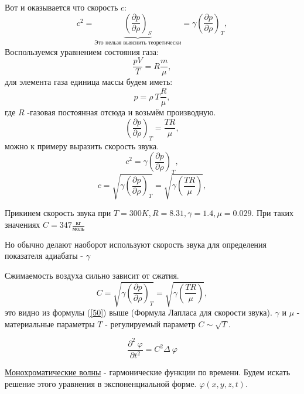 \documentclass[14pt,a4paper,oneside]{extarticle}	%
\newcommand{\bracket}[1] {\left( #1 \right) } %
\newcommand{\dd}[1] {\partial #1 }
\begin{document}
Вот и оказывается что скорость $ c $:
\begin{equation}\label{45}
c^{2} = \underbrace{\bracket{\frac{\dd{p}}{\dd{\rho}}}_{S}}_{\text{Это нельзя выяснить теоретически}} = \gamma\bracket{\frac{\dd{p}}{\dd{\rho}}}_{T},
\end{equation}
Воспользуемся уравнением состояния газа:
\begin{equation}\label{46}
\frac{pV}{T} = R\frac{m}{\mu},
\end{equation}
для элемента газа единица массы будем иметь:
\begin{equation}\label{47}
p = \rho\: T\frac{R}{\mu},
\end{equation} 
где $ R $ -газовая постоянная 
отсюда и возьмём производную.
\begin{equation}\label{48}
\bracket{\frac{\dd{p}}{\dd{\rho}}}_{T} = \frac{TR}{\mu},
\end{equation} 
можно к примеру выразить скорость звука.
\begin{equation}\label{49}
c^{2} = \gamma\bracket{\frac{\dd{p}}{\dd{\rho}}}_{T},
\end{equation}
\begin{equation}\label{50}
c = \sqrt{\gamma\bracket{\frac{\dd{p}}{\dd{\rho}}}_{T}} = \sqrt{\gamma\bracket{\frac{TR}{\mu}}},
\end{equation}
 
Прикинем скорость звука при $ T = 300K, R = 8.31, \gamma = 1.4, \mu = 0.029$.
При таких значениях $ C = 347 \frac{\text{кг}}{\text{моль}}$

Но обычно делают наоборот используют скорость звука для определения показателя адиабаты - $ \gamma $  

Сжимаемость воздуха сильно зависит от сжатия.
\begin{equation*}
C = \sqrt{\gamma\bracket{\frac{\dd{p}}{\dd{\rho}}}_{T}} = \sqrt{\gamma\bracket{\frac{TR}{\mu}}},
\end{equation*}
это видно из формулы (\ref{50}) выше  (Формула Лапласа для скорости звука).
$ \gamma $ и $ \mu $ - материальные параметры
$ T $ - регулируемый параметр $ C \sim \sqrt{T} $.

\begin{equation}\label{51}
\frac{\dd{^{2}\:\varphi}}{\dd{t^{2}}} = C^{2}\Delta\:\varphi
\end{equation}

\underline{Монохроматические волны} - гармонические функции по времени. Будем искать решение этого уравнения в экспоненциальной форме.
$ \varphi(x,y,z,t) $.
\end{document}
